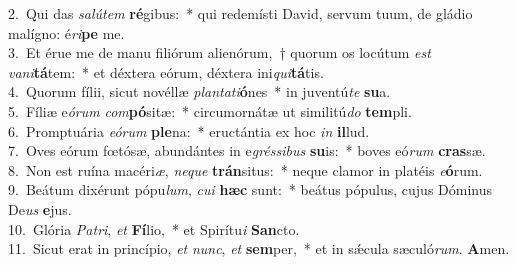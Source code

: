 {2.~}Qui das \textit{sa}\textit{lú}\textit{tem} \textbf{ré}gibus:~* qui redemísti David, servum tuum, de gládio malígno: é\textit{ri}\textbf{pe} me.\\
{3.~}Et érue me de manu filiórum alienórum,~† quorum os locútum \textit{est} \textit{va}\textit{ni}\textbf{tá}tem:~* et déxtera eórum, déxtera ini\textit{qui}\textbf{tá}tis.\\
{4.~}Quorum fílii, sicut novéllæ \textit{plan}\textit{ta}\textit{ti}\textbf{ó}nes~* in juventú\textit{te} \textbf{su}a.\\
{5.~}Fíliæ e\textit{ó}\textit{rum} \textit{com}\textbf{pó}sitæ:~* circumornátæ ut similitú\textit{do} \textbf{tem}pli.\\
{6.~}Promptuária \textit{e}\textit{ó}\textit{rum} \textbf{ple}na:~* eructántia ex hoc \textit{in} \textbf{il}lud.\\
{7.~}Oves eórum fœtósæ, abundántes in e\textit{grés}\textit{si}\textit{bus} \textbf{su}is:~* boves eó\textit{rum} \textbf{cras}sæ.\\
{8.~}Non est ruína macéri\textit{æ}, \textit{ne}\textit{que} \textbf{trán}situs:~* neque clamor in platéis \textit{e}\textbf{ó}rum.\\
{9.~}Beátum dixérunt pópu\textit{lum}, \textit{cu}\textit{i} \textbf{hæc} sunt:~* beátus pópulus, cujus Dóminus De\textit{us} \textbf{e}jus.\\
{10.~}Glória \textit{Pa}\textit{tri}, \textit{et} \textbf{Fí}lio,~* et Spirítu\textit{i} \textbf{San}cto.\\
{11.~}Sicut erat in princípio, \textit{et} \textit{nunc}, \textit{et} \textbf{sem}per,~* et in sǽcula sæculó\textit{rum}. \textbf{A}men.\\
